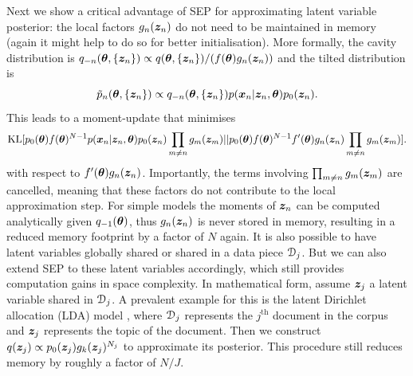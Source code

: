 Next we show a critical advantage of SEP for approximating latent variable posterior: the local factors $g_n(\bm{z}_n)$ do not need to be maintained in memory (again it might help to do so for better initialisation).
%
More formally, the cavity distribution is $q_{-n}(\bm{\theta}, \{ \bm{z}_n\}) \propto q(\bm{\theta}, \{ \bm{z}_n\})/(f(\bm{\theta}) g_n(\bm{z}_n)) $ and the tilted distribution is $$\tilde{p}_n(\bm{\theta}, \{ \bm{z}_n\}) \propto q_{-n}(\bm{\theta}, \{ \bm{z}_n\}) p(\bm{x}_n | \bm{z}_n, \bm{\theta})p_0(\bm{z}_n).$$ This leads to a moment-update that minimises 
%
\begin{equation}
\mathrm{KL}[ p_0(\bm{\theta}) f(\bm{\theta})^{N-1} p(\bm{x}_n | \bm{z}_n, \bm{\theta})p_0(\bm{z}_n) \prod_{m\ne n} g_m(\bm{z}_m) || p_0(\bm{\theta}) f(\bm{\theta})^{N-1} f'(\bm{\theta}) g_n(\bm{z}_n) \prod_{m\ne n} g_m(\bm{z}_m)] .\nonumber
\end{equation}
%
with respect to $f'(\bm{\theta}) g_n(\bm{z}_n)$. Importantly, the terms involving $\prod_{m\ne n} g_m(\bm{z}_m)$ are cancelled, meaning that these factors do not contribute to the local approximation step. For simple models the moments of $\bm{z}_n$ can be computed analytically given $q_{-1}(\bm{\theta})$, thus $g_n(\bm{z}_n)$ is never stored in memory, resulting in a reduced memory footprint by a factor of $N$ again. 
%
It is also possible to have latent variables globally shared or shared in a data piece $\mathcal{D}_j$. But we can also extend SEP to these latent variables accordingly, which still provides computation gains in space complexity. In mathematical form, assume $\bm{z}_j$ a latent variable shared in $\mathcal{D}_j$. A prevalent example for this is the latent Dirichlet allocation (LDA) model \citep{blei:lda2003}, where $\mathcal{D}_j$ represents the $j^{\text{th}}$ document in the corpus and $\bm{z}_j$ represents the topic of the document. Then we construct $q(\bm{z}_j) \propto p_0(\bm{z}_j) g_k(\bm{z}_j)^{N_j}$ to approximate its posterior. This procedure still reduces memory by roughly a factor of $N/J$.
%

